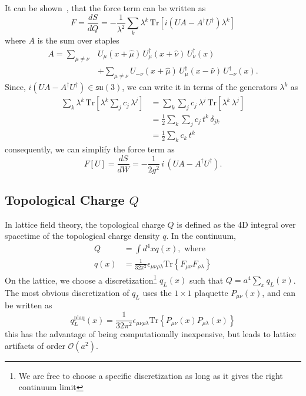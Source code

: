 \documentclass[a4paper,11pt]{article}
\begin{document}
It can be shown~\cite{TODO}, that the force term can be written as
\begin{equation}
    F = \frac{d S}{dQ} = - \frac{1}{\lambda^{2}} \sum_{k} \lambda^{k} \, \mathrm{Tr}\left[ i \left(UA - A^{\dagger}U^{\dagger}\right) \lambda^{k} \right]
\end{equation}
%
where $A$ is the sum over staples
%
\begin{align}
A = \sum_{\mu\neq\nu}& U_{\mu}(x +\hat{\mu})\, U^{\dagger}_{\mu}(x + \hat{\nu}) \, U^{\dagger}_{\nu}(x) \\ 
&+ \sum_{\mu\neq\nu} U_{-\nu}(x + \hat{\mu})\, U^{\dagger}_{\mu}(x - \hat{\nu})\, U^{\dagger}_{-\nu}(x).
\end{align}
%
Since, $i\left(UA - A^{\dagger}U^{\dagger}\right) \in \mathfrak{su}(3)$,
we can write it in terms of the generators $\lambda^{k}$ as
%
\begin{align}
    \sum_{k} \lambda^{k} \,\mathrm{Tr}\left[ \lambda^{k} \sum_{j} c_{j}\, \lambda^{j}\right] &= \sum_{k}\sum_{j} c_{j}\, \lambda^{j} \,\mathrm{Tr}\left[ \lambda^{k} \, \lambda^{j}\right] \\
    &= \frac{1}{2}\sum_{k}\sum_{j} c_{j}\, t^{k}\, \delta_{jk} \\
    &= \frac{1}{2}\sum_{k} c_{k} \, t^{k}
\end{align}
%
consequently, we can simplify the force term as
%
\begin{equation}
    F[U] = \frac{dS}{dW} = - \frac{1}{2g^{2}}\, i \, \left(UA - A^{\dagger}U^{\dagger}\right).
\end{equation}
%

\subsection{\label{subsec:topological_charge}Topological Charge \texorpdfstring{$Q$}{Q}}
%
In lattice field theory, the topological charge $Q$ is defined as the 4D
integral over spacetime of the topological charge density $q$.
%
In the continuum,
%
\begin{align}
    Q &= \int d^{4}x q(x), \text{ where } \\
    q(x) &= \frac{1}{32\pi^{2}} \epsilon_{\mu\nu\rho\lambda} \mathrm{Tr}\left\{ F_{\mu\nu} F_{\rho\lambda} \right\}
\end{align}
%
On the lattice, we choose a discretization\footnote{We are free to choose a specific discretization as long as it gives the right continuum limit} $q_{L}(x)$ such that
$Q = a^{4} \sum_{x} q_{L}(x)$.
%
The most obvious discretization of $q_{L}$ uses the $1\times1$ plaquette
$P_{\mu\nu}(x)$, and can be written as
%
\begin{equation}
    q^{\mathrm{plaq}}_{L}(x) = \frac{1}{32\pi^{2}} \epsilon_{\mu\nu\rho\lambda} \mathrm{Tr}\left\{P_{\mu\nu}(x) P_{\rho\lambda}(x)\right\}
\end{equation}
%
this has the advantage of being computationally inexpensive, but leads
to lattice artifacts of order $\mathcal{O}(a^{2})$.


\clearpage

\nocite{*}
{}


\end{document}
